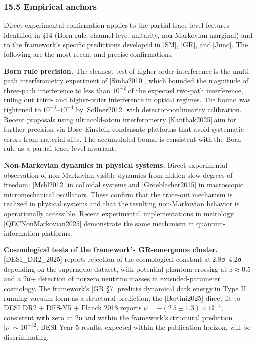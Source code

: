 \documentclass[
]{article}
\begin{document}
\hypertarget{empirical-anchors}{%
\subsubsection{15.5 Empirical anchors}\label{empirical-anchors}}

Direct experimental confirmation applies to the partial-trace-level
features identified in §14 (Born rule, channel-level unitarity,
non-Markovian marginal) and to the framework's specific predictions
developed in {[}SM{]}, {[}GR{]}, and {[}Juno{]}. The following are the
most recent and precise confirmations.

\textbf{Born rule precision.} The cleanest test of higher-order
interference is the multi-path interferometry experiment of
{[}Sinha2010{]}, which bounded the magnitude of three-path interference
to less than \(10^{-2}\) of the expected two-path interference, ruling
out third- and higher-order interference in optical regimes. The bound
was tightened to \(10^{-3}\)--\(10^{-4}\) by {[}Söllner2012{]} with
detector-nonlinearity calibration. Recent proposals using ultracold-atom
interferometry {[}Kanthak2025{]} aim for further precision via
Bose--Einstein condensate platforms that avoid systematic errors from
material slits. The accumulated bound is consistent with the Born rule
as a partial-trace-level invariant.

\textbf{Non-Markovian dynamics in physical systems.} Direct experimental
observation of non-Markovian visible dynamics from hidden slow degrees
of freedom: {[}Mehl2012{]} in colloidal systems and
{[}Groeblacher2015{]} in macroscopic micromechanical oscillators. These
confirm that the trace-out mechanism is realized in physical systems and
that the resulting non-Markovian behavior is operationally accessible.
Recent experimental implementations in metrology
{[}QECNonMarkovian2025{]} demonstrate the same mechanism in
quantum-information platforms.

\textbf{Cosmological tests of the framework's GR-emergence cluster.}
{[}DESI\_DR2\_2025{]} reports rejection of the cosmological constant at
2.8σ--4.2σ depending on the supernovae dataset, with potential phantom
crossing at \(z \approx 0.5\) and a 2σ+ detection of nonzero neutrino
masses in extended-parameter cosmology. The framework's {[}GR §7{]}
predicts dynamical dark energy in Type II running-vacuum form as a
structural prediction; the {[}Bertini2025{]} direct fit to DESI DR2 +
DES-Y5 + Planck 2018 reports \(\nu = -(2.5 \pm 1.3) \times 10^{-4}\),
consistent with zero at 2σ and within the framework's structural
prediction \(|\nu| \sim 10^{-32}\). DESI Year 5 results, expected within
the publication horizon, will be discriminating.
\end{document}
